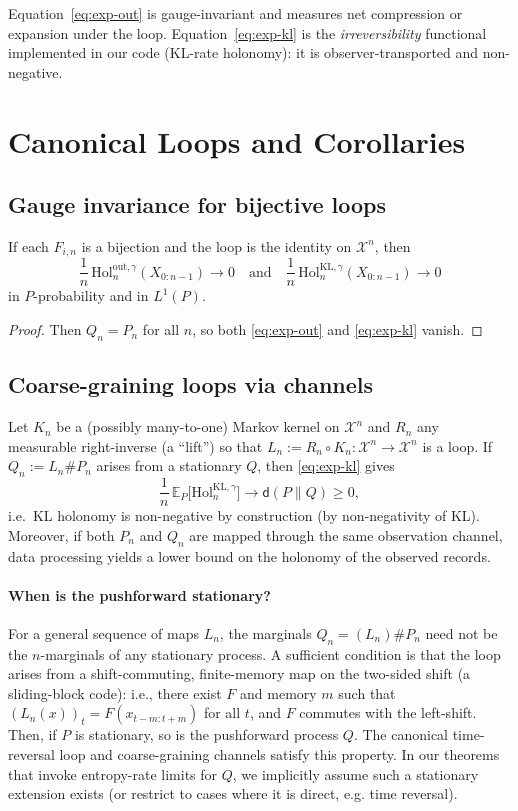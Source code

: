 \documentclass[11pt]{article}
\newcommand{\X}{\mathcal{X}}
\newcommand{\E}{\mathbb{E}}
\newcommand{\1}{\mathbbm{1}}
\newcommand{\push}{\#}
\begin{document}
\begin{remark}[Scope]
Equation~\eqref{eq:exp-out} is gauge-invariant and measures net compression or expansion under the loop. Equation~\eqref{eq:exp-kl} is the \emph{irreversibility} functional implemented in our code (KL-rate holonomy): it is observer-transported and non-negative.
\end{remark}

\section{Canonical Loops and Corollaries}

\subsection{Gauge invariance for bijective loops}

\begin{corollary}\label{cor:gauge}
If each $F_{i,n}$ is a bijection and the loop is the identity on $\X^n$, then
\[
\frac{1}{n}\,\mathrm{Hol}_{n}^{\mathrm{out},\gamma}(X_{0:n-1}) \to 0
\quad\text{and}\quad
\frac{1}{n}\,\mathrm{Hol}_{n}^{\mathrm{KL},\gamma}(X_{0:n-1}) \to 0
\]
in $P$-probability and in $L^1(P)$.
\end{corollary}
\begin{proof}
Then $Q_n=P_n$ for all $n$, so both \eqref{eq:exp-out} and \eqref{eq:exp-kl} vanish.
\end{proof}

\subsection{Coarse-graining loops via channels}
Let $K_n$ be a (possibly many-to-one) Markov kernel on $\X^n$ and $R_n$ any measurable right-inverse (a ``lift'') so that $L_n:=R_n\circ K_n:\X^n\to\X^n$ is a loop. If $Q_n:=L_n\push P_n$ arises from a stationary $Q$, then \eqref{eq:exp-kl} gives
\[
\frac{1}{n}\,\E_P\big[\mathrm{Hol}_{n}^{\mathrm{KL},\gamma}\big] \to \mathsf{d}(P\|Q) \ge 0,
\]
i.e.\ KL holonomy is non-negative by construction (by non-negativity of KL).
Moreover, if both $P_n$ and $Q_n$ are mapped through the same observation channel,
data processing yields a lower bound on the holonomy of the observed records.

\paragraph{When is the pushforward stationary?}
For a general sequence of maps $L_n$, the marginals $Q_n=(L_n)\#P_n$ need not be the $n$-marginals of any stationary process.
A sufficient condition is that the loop arises from a shift-commuting, finite-memory map on the two-sided shift
(a sliding-block code): i.e., there exist $F$ and memory $m$ such that $(L_n(x))_t = F(x_{t-m:t+m})$ for all $t$,
and $F$ commutes with the left-shift.
Then, if $P$ is stationary, so is the pushforward process $Q$. The canonical time-reversal loop and
coarse-graining channels satisfy this property. In our theorems that invoke entropy-rate limits for $Q$,
we implicitly assume such a stationary extension exists (or restrict to cases where it is direct, e.g. time reversal).
\end{document}
